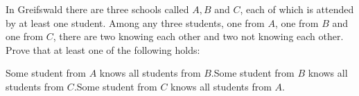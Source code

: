 In Greifswald there are three schools called $A,B$ and $C$,  each of which is attended by at least one student. Among any three students, one from $A$,  one from $B$ and one from $C$,  there are two knowing each other and two not knowing each other. Prove that at least one of the following holds:

Some student from $A$ knows all students from $B$.Some student from $B$ knows all students from $C$.Some student from $C$ knows all students from $A$.